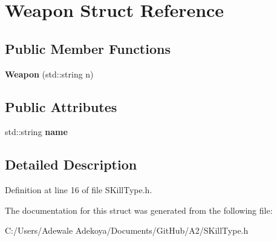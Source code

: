 \hypertarget{struct_weapon}{}\section{Weapon Struct Reference}
\label{struct_weapon}
\subsection*{Public Member Functions}
\begin{DoxyCompactItemize}
\item 
\hypertarget{struct_weapon_a3066227b3eb4195b1e28b7c2b0c660f6}{}{\bfseries Weapon} (std\+::string n)\label{struct_weapon_a3066227b3eb4195b1e28b7c2b0c660f6}

\end{DoxyCompactItemize}
\subsection*{Public Attributes}
\begin{DoxyCompactItemize}
\item 
\hypertarget{struct_weapon_a8bc12bf0ac8e3cdea9c8657ccb6217b5}{}std\+::string {\bfseries name}\label{struct_weapon_a8bc12bf0ac8e3cdea9c8657ccb6217b5}

\end{DoxyCompactItemize}


\subsection{Detailed Description}


Definition at line 16 of file S\+Kill\+Type.\+h.



The documentation for this struct was generated from the following file\+:\begin{DoxyCompactItemize}
\item 
C\+:/\+Users/\+Adewale Adekoya/\+Documents/\+Git\+Hub/\+A2/S\+Kill\+Type.\+h\end{DoxyCompactItemize}
